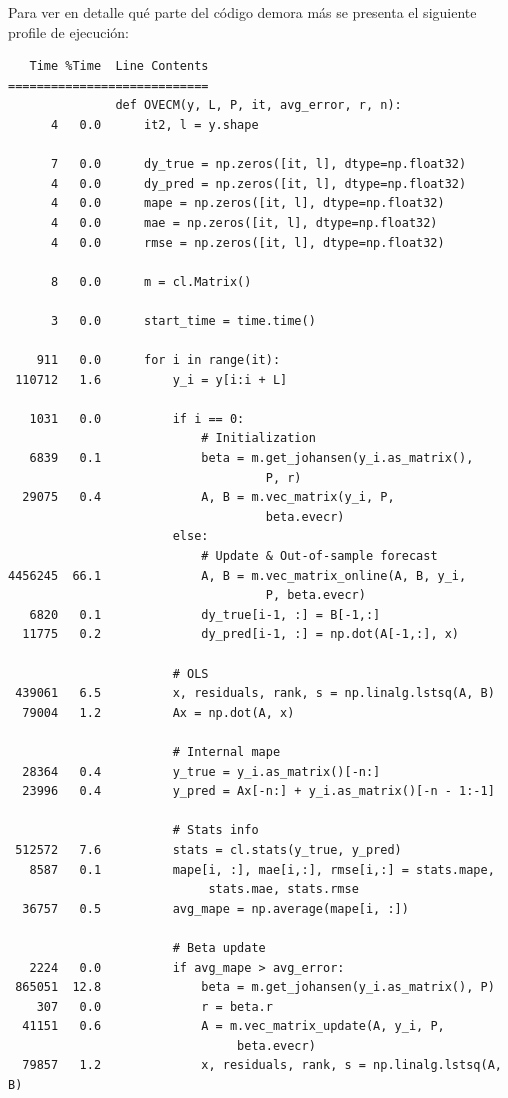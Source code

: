 Para ver en detalle qué parte del código demora más se presenta el siguiente
profile de ejecución:
\begin{verbatim}
   Time %Time  Line Contents
============================
               def OVECM(y, L, P, it, avg_error, r, n):
      4   0.0      it2, l = y.shape
               
      7   0.0      dy_true = np.zeros([it, l], dtype=np.float32)
      4   0.0      dy_pred = np.zeros([it, l], dtype=np.float32)
      4   0.0      mape = np.zeros([it, l], dtype=np.float32)
      4   0.0      mae = np.zeros([it, l], dtype=np.float32)
      4   0.0      rmse = np.zeros([it, l], dtype=np.float32)
               
      8   0.0      m = cl.Matrix()
               
      3   0.0      start_time = time.time()
               
    911   0.0      for i in range(it):
 110712   1.6          y_i = y[i:i + L]
               
   1031   0.0          if i == 0:
                           # Initialization
   6839   0.1              beta = m.get_johansen(y_i.as_matrix(), 
                                    P, r)
  29075   0.4              A, B = m.vec_matrix(y_i, P, 
                                    beta.evecr)
                       else:
                           # Update & Out-of-sample forecast
4456245  66.1              A, B = m.vec_matrix_online(A, B, y_i, 
                                    P, beta.evecr)
   6820   0.1              dy_true[i-1, :] = B[-1,:]
  11775   0.2              dy_pred[i-1, :] = np.dot(A[-1,:], x)
               
                       # OLS
 439061   6.5          x, residuals, rank, s = np.linalg.lstsq(A, B)
  79004   1.2          Ax = np.dot(A, x)
               
                       # Internal mape
  28364   0.4          y_true = y_i.as_matrix()[-n:]
  23996   0.4          y_pred = Ax[-n:] + y_i.as_matrix()[-n - 1:-1]
               
                       # Stats info
 512572   7.6          stats = cl.stats(y_true, y_pred)
   8587   0.1          mape[i, :], mae[i,:], rmse[i,:] = stats.mape, 
                            stats.mae, stats.rmse
  36757   0.5          avg_mape = np.average(mape[i, :])
               
                       # Beta update
   2224   0.0          if avg_mape > avg_error:
 865051  12.8              beta = m.get_johansen(y_i.as_matrix(), P)
    307   0.0              r = beta.r
  41151   0.6              A = m.vec_matrix_update(A, y_i, P, 
                                beta.evecr)
  79857   1.2              x, residuals, rank, s = np.linalg.lstsq(A, B)
               

\end{verbatim}
